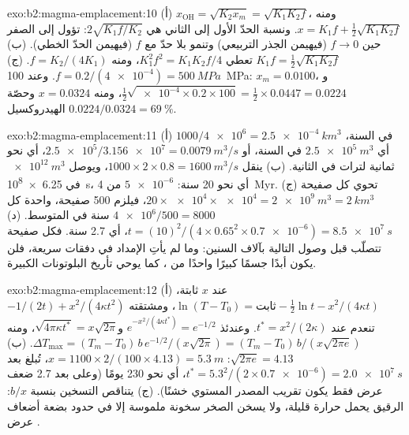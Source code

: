 \begin{solution}{exo:b2:magma-emplacement:10}
(أ) $x_{\mathrm{OH}} = \sqrt{K_2x_m} = \sqrt{K_1K_2f}$، ومنه $x = K_1f + \frac12\sqrt{K_1K_2f}$.
ونسبة الحدّ الأول إلى الثاني هي $2\sqrt{K_1f/K_2}$: تؤول إلى الصفر
حين $f \to 0$ (فيهيمن الجذر التربيعي) وتنمو بلا حدّ مع $f$ (فيهيمن
الحدّ الخطي). (ب) $K_1 f = \frac12\sqrt{K_1K_2 f}$ تعطي $K_1^2f^2 =
K_1K_2f/4$، ومنه $f = K_2/(4K_1)$. (ج) $f = 0.2/(\num{4e-4}) = \qty{500}{MPa}$. وعند
\qty{100}{MPa}: $x_m = 0.0100$، و$\frac12\sqrt{\num{e-4}\times0.2\times100} =
\frac12\times0.0447 = 0.0224$، ومنه $x = 0.0324$ وحصّة الهيدروكسيل
$0.0224/0.0324 = \qty{69}{\percent}$.
\end{solution}

\begin{solution}{exo:b2:magma-emplacement:11}
(أ) $1000/\num{4e6} = \qty{2.5e-4}{km^3}$ في السنة، أي $\qty{2.5e5}{m^3}$ في السنة،
أو $\num{2.5e5}/\num{3.156e7} = \qty{0.0079}{m^3/s}$، أي نحو ثمانية لترات في الثانية.
(ب) ينقل  $1000\times2\times0.8 = \qty{1600}{m^3/s}$، ويوصل
$\qty{e12}{m^3}$ في \qty{6.25e8}{s}، أي نحو 20 سنة: $\num{5e-6}$ من
\qty{4}{Myr}. (ج) تحوي كل صفيحة $20\times\num{e4}\times\num{e4} = \qty{2e9}{m^3} =
\qty{2}{km^3}$، فيلزم 500 صفيحة، واحدة كل $\num{4e6}/500 = 8000$ سنة في المتوسط.
(د) $t = (10)^2/(4\times0.65^2\times\num{0.7e-6}) = \qty{8.5e7}{s}$، أي 2.7 سنة. فكل
صفيحة تتصلّب قبل وصول التالية بآلاف السنين: وما لم يأتِ الإمداد
في دفقات سريعة، فلن يكون  أبدًا جسمًا كبيرًا واحدًا من ، كما
يوحي تأريخ البلوتونات الكبيرة.
\end{solution}

\begin{solution}{exo:b2:magma-emplacement:12}
(أ) عند $x$ ثابتة، $\ln(T - T_0) = \text{ثابت} - \frac12\ln t - x^2/(4\kappa t)$،
ومشتقته $-1/(2t) + x^2/(4\kappa t^2)$ تنعدم عند $t^* = x^2/(2\kappa)$. وعندئذ
$e^{-x^2/(4\kappa t^*)} = e^{-1/2}$ و$\sqrt{4\pi\kappa t^*} = x\sqrt{2\pi}$، ومنه $\Delta
T_{\max} = (T_m - T_0)\,b\,e^{-1/2}/(x\sqrt{2\pi}) = (T_m - T_0)\,b/(x\sqrt{2\pi e})$. (ب)
$\sqrt{2\pi e} = 4.13$: $x = 1100\times2/(100\times4.13) = \qty{5.3}{m}$، تُبلغ بعد
$t^* = 5.3^2/(2\times\num{0.7e-6}) = \qty{2.0e7}{s}$، أي نحو 230 يومًا (وعلى بعد 2.7
ضعف عرض  فقط يكون تقريب المصدر المستوي خشنًا). (ج) يتناقص التسخين
بنسبة $b/x$:  الرقيق يحمل حرارة قليلة، ولا يسخن الصخر سخونة ملموسة
إلا في حدود بضعة أضعاف عرض .
\end{solution}

